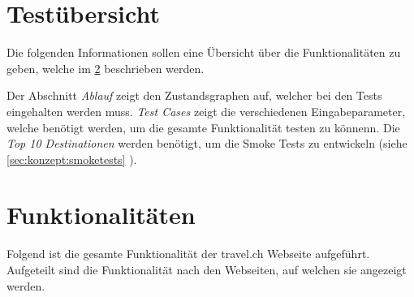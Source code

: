 
\appendix
\chapter{Testübersicht}
\label{app:Testfälle}
Die folgenden Informationen sollen eine Übersicht über die Funktionalitäten zu geben, welche im  \cref{app:Funktionalitäten}  beschrieben werden.

Der Abschnitt \textit{Ablauf} zeigt den Zustandsgraphen auf, welcher bei den Tests eingehalten werden muss. \textit{Test Cases} zeigt die verschiedenen Eingabeparameter, welche benötigt werden, um die gesamte Funktionalität testen zu könnenn. Die \textit{Top 10 Destinationen} werden benötigt, um die Smoke Tests zu entwickeln (siehe \cref{sec:konzept:smoketests} ).







\chapter{Funktionalitäten}
\label{app:Funktionalitäten}
Folgend ist die gesamte Funktionalität der travel.ch Webseite aufgeführt. Aufgeteilt sind die Funktionalität nach den Webseiten, auf welchen sie angezeigt werden.

